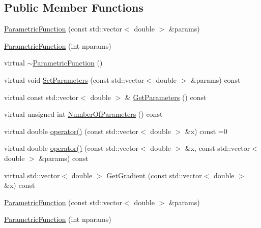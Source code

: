 \subsection*{Public Member Functions}
\begin{DoxyCompactItemize}
\item 
\mbox{\hyperlink{classROOT_1_1Minuit2_1_1ParametricFunction_a5abce16504b1532a38da1409afdaa71d}{Parametric\+Function}} (const std\+::vector$<$ double $>$ \&params)
\item 
\mbox{\hyperlink{classROOT_1_1Minuit2_1_1ParametricFunction_a0b8e823b3a61fc0f20ffe419e0fa1e1a}{Parametric\+Function}} (int nparams)
\item 
virtual \mbox{\hyperlink{classROOT_1_1Minuit2_1_1ParametricFunction_a18aae731e634b4fc1c79403d8f49caa9}{$\sim$\+Parametric\+Function}} ()
\item 
virtual void \mbox{\hyperlink{classROOT_1_1Minuit2_1_1ParametricFunction_a63417244db376ec27f2c85ee6432f552}{Set\+Parameters}} (const std\+::vector$<$ double $>$ \&params) const
\item 
virtual const std\+::vector$<$ double $>$ \& \mbox{\hyperlink{classROOT_1_1Minuit2_1_1ParametricFunction_ac3e70b4d9b0cbe60c529823f6a612a5e}{Get\+Parameters}} () const
\item 
virtual unsigned int \mbox{\hyperlink{classROOT_1_1Minuit2_1_1ParametricFunction_a8e5e21de5e8f6e5bedd1ae7ea27b24ac}{Number\+Of\+Parameters}} () const
\item 
virtual double \mbox{\hyperlink{classROOT_1_1Minuit2_1_1ParametricFunction_a953426fa51c84cdef3eba24274131806}{operator()}} (const std\+::vector$<$ double $>$ \&x) const =0
\item 
virtual double \mbox{\hyperlink{classROOT_1_1Minuit2_1_1ParametricFunction_a5fab6e804e0f93bd593580f582b0f7c5}{operator()}} (const std\+::vector$<$ double $>$ \&x, const std\+::vector$<$ double $>$ \&params) const
\item 
virtual std\+::vector$<$ double $>$ \mbox{\hyperlink{classROOT_1_1Minuit2_1_1ParametricFunction_abe6cfa5c64c578101da1d6fcecfb2249}{Get\+Gradient}} (const std\+::vector$<$ double $>$ \&x) const
\item 
\mbox{\hyperlink{classROOT_1_1Minuit2_1_1ParametricFunction_a5abce16504b1532a38da1409afdaa71d}{Parametric\+Function}} (const std\+::vector$<$ double $>$ \&params)
\item 
\mbox{\hyperlink{classROOT_1_1Minuit2_1_1ParametricFunction_a0b8e823b3a61fc0f20ffe419e0fa1e1a}{Parametric\+Function}} (int nparams)
\item 

\end{DoxyCompactItemize}
